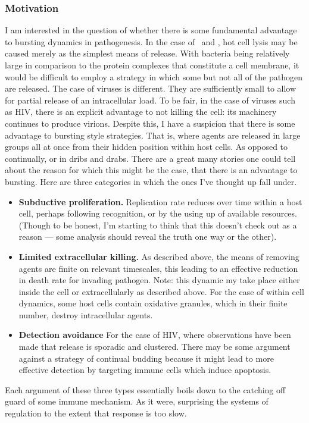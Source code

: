 \subsubsection{Motivation}

I am interested in the question of whether there is some fundamental advantage to bursting dynamics in pathogenesis. In the case of \ft \, and \yp, hot cell lysis may be caused merely as the simplest means of release. With bacteria being relatively large in comparison to the protein complexes that constitute a cell membrane, it would be difficult to employ a strategy in which some but not all of the pathogen are released. The case of viruses is different. They are sufficiently small to allow for partial release of an intracellular load. To be fair, in the case of viruses such as HIV, there is an explicit advantage to not killing the cell: its machinery continues to produce virions. Despite this, I have a suspicion that there is some advantage to bursting style strategies. That is, where agents are released in large groups all at once from their hidden position within host cells. As opposed to continually, or in dribs and drabs. There are a great many stories one could tell about the reason for which this might be the case, that there is an advantage to bursting. Here are three categories in which the ones I've thought up fall under. 

\begin{itemize}
\item \textbf{Subductive proliferation.} Replication rate reduces over time within a host cell, perhaps following recognition, or by the using up of available resources. (Though to be honest, I'm starting to think that this doesn't check out as a reason --- some analysis should reveal the truth one way or the other).
\item  \textbf{Limited extracellular killing.} As described above, the means of removing agents are finite on relevant timescales, this leading to an effective reduction in death rate for invading pathogen. Note: this dynamic my take place either inside the cell or extracellularly as described above. For the case of within cell dynamics, some host cells contain oxidative granules, which in their finite number, destroy intracellular agents.  
\item \textbf{Detection avoidance}
For the case of HIV, where observations have been made that release is sporadic and clustered. There may be some argument against a strategy of continual budding because it might lead to more effective detection by targeting immune cells which induce apoptosis. 
\end{itemize}
Each argument of these three types essentially boils down to the catching off guard of some immune mechanism. As it were, surprising the systems of regulation to the extent that response is too slow. 






